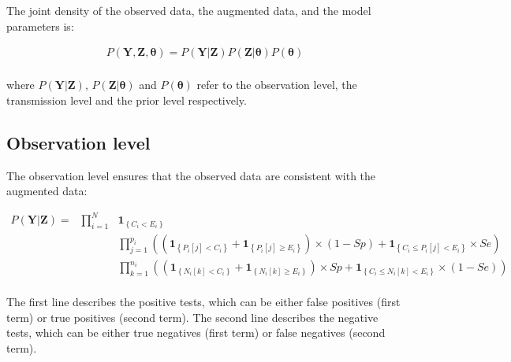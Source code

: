 \documentclass[10pt]{article}
\begin{document}
The joint density of the observed data, the augmented data, and the model parameters is: 

\begin{equation} \label {JointDensity}
\begin{split}
P\left(\bm{Y},\bm{Z},\bm{\theta}\right) = P\left(\bm{Y}|\bm{Z}\right)P\left(\bm{Z}|\bm{\theta}\right)P\left(\bm{\theta}\right)\\ \nonumber
\end{split}
\end{equation}

\noindent where $P\left(\bm{Y}|\bm{Z}\right)$, $P\left(\bm{Z}|\bm{\theta}\right)$ 
and $P\left(\bm{\theta}\right)$ refer to the observation level, the transmission level
 and the prior level respectively.


\subsection*{Observation level}


The observation level ensures that the observed data are consistent with the augmented data:

\begin{eqnarray*}
P\left(\bm{Y}|\bm{Z}\right) = &
\bm{\prod}_{i=1}^N & %
 \mathbf{1}_{\left\lbrace C_i < E_i \right\rbrace} \\
 &&
 \bm{\prod}_{j=1}^{p_i} %
\left(
\left( \mathbf{1}_{\left\lbrace P_i[j] < C_i \right\rbrace}+\mathbf{1}_{\left\lbrace P_i[j] \geq E_i \right\rbrace} \right) \times \left(1-Sp\right) %
+ \mathbf{1}_{\left\lbrace C_i \leq P_i[j] < E_i \right\rbrace} \times Se %
\right) \\ 
& & \bm{\prod}_{k=1}^{n_i} %
\left(
\left( \mathbf{1}_{\left\lbrace N_i[k] < C_i \right\rbrace}+\mathbf{1}_{\left\lbrace N_i[k] \geq E_i \right\rbrace} \right) \times Sp %
+ \mathbf{1}_{\left\lbrace C_i \leq N_i[k] < E_i \right\rbrace} \times \left(1-Se\right) %
\right) \\ 
\end{eqnarray*}

The first line describes the positive tests, which can be either false positives (first term) or true positives (second term). 
The second line describes the negative tests, which can be either true negatives (first term) or false negatives (second term). 
\end{document}
